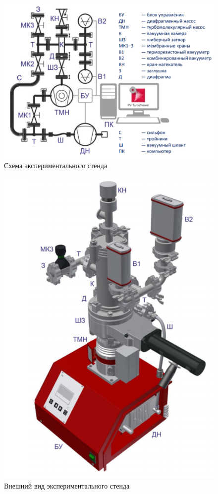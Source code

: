 \documentclass[12pt,a4paper]{article}
\begin{document}
\begin{figure}[H]
	\centering
	\includegraphics[width = 11.5 cm]{res/Схема}
	\caption{Схема экспериментального стенда}
	\label{fig:vac}
\end{figure}
\begin{figure}[H]
	\centering
	\includegraphics[width = 6.5 cm]{res/Внешний вид}
	\caption{Внешний вид экспериментального стенда}
	\label{fig:vac}
\end{figure}
\end{document}
